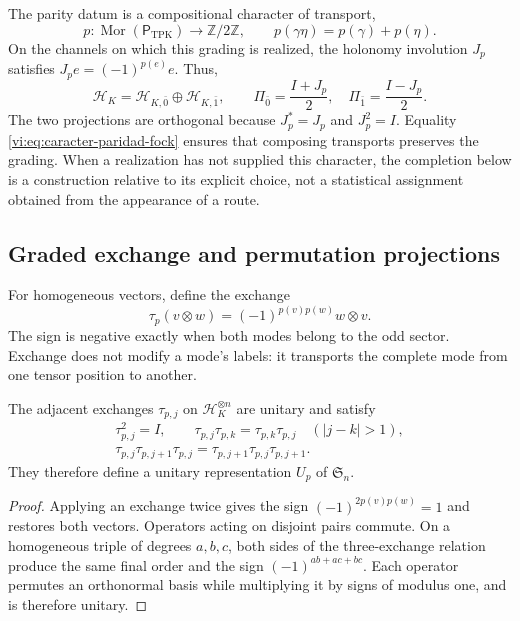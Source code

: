 The parity datum is a compositional character of transport,
\begin{equation}
 p:\operatorname{Mor}(\mathsf P_{\mathrm{TPK}})
 \longrightarrow\mathbb Z/2\mathbb Z,
 \qquad p(\gamma\eta)=p(\gamma)+p(\eta).
 \label{vi:eq:caracter-paridad-fock}
\end{equation}
On the channels on which this grading is realized, the holonomy involution
\(J_p\) satisfies \(J_pe=(-1)^{p(e)}e\). Thus,
\[
 \mathcal H_K=\mathcal H_{K,\bar0}\oplus\mathcal H_{K,\bar1},
 \qquad \Pi_{\bar0}=\frac{I+J_p}{2},\quad
 \Pi_{\bar1}=\frac{I-J_p}{2}.
\]
The two projections are orthogonal because \(J_p^*=J_p\) and
\(J_p^2=I\). Equality \eqref{vi:eq:caracter-paridad-fock} ensures
that composing transports preserves the grading. When a realization has
not supplied this character, the completion below is a construction
relative to its explicit choice, not a statistical assignment obtained
from the appearance of a route.

\subsection{Graded exchange and permutation projections}
\label{vi:subsec:intercambio-graduado}

For homogeneous vectors, define the exchange
\begin{equation}
 \tau_p(v\otimes w)=(-1)^{p(v)p(w)}w\otimes v.
 \label{vi:eq:intercambio-graduado}
\end{equation}
The sign is negative exactly when both modes belong to the odd sector.
Exchange does not modify a mode's labels: it transports the complete
mode from one tensor position to another.

\begin{proposition}
\label{vi:prop:permutaciones-graduadas}
The adjacent exchanges \(\tau_{p,j}\) on
\(\mathcal H_K^{\otimes n}\) are unitary and satisfy
\[
\begin{gathered}
 \tau_{p,j}^2=I,\qquad
 \tau_{p,j}\tau_{p,k}=\tau_{p,k}\tau_{p,j}\quad(|j-k|>1),\\
 \tau_{p,j}\tau_{p,j+1}\tau_{p,j}
 =\tau_{p,j+1}\tau_{p,j}\tau_{p,j+1}.
\end{gathered}
\]
They therefore define a unitary representation \(U_p\) of
\(\mathfrak S_n\).
\end{proposition}
\begin{proof}
Applying an exchange twice gives the sign
\((-1)^{2p(v)p(w)}=1\) and restores both vectors.
Operators acting on disjoint pairs commute. On a homogeneous triple
of degrees \(a,b,c\), both sides of the three-exchange relation
produce the same final order and the sign
\((-1)^{ab+ac+bc}\). Each operator permutes an orthonormal basis
while multiplying it by signs of modulus one, and is therefore unitary.
\end{proof}

